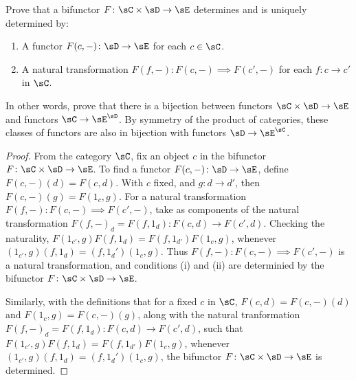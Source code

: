 \documentclass[../../main]{subfiles}
\begin{document}
\begin{exercise}
	Prove that a bifunctor $F\colon \sC \times \sD \rightarrow \sE$ determines and is
	uniquely determined by:
	\begin{enumerate}
		\item A functor $F(c,-)\colon\sD \rightarrow \sE$ for each $c \in \sC$.
		\item A natural transformation $F(f,-)\colon F(c,-) \implies F(c',-)$
			for each $f\colon c \rightarrow c'$ in $\sC$.
	\end{enumerate}
	In other words, prove that there is a bijection between functors $\sC \times
	\sD \rightarrow \sE$ and functors $\sC \rightarrow \sE^\sD $. By symmetry of the product
	of categories, these classes of functors are also in bijection with functors
	\(\sD\to\sE^\sC\).
\end{exercise}

\begin{proof}
	From the category $\sC$, fix an object $c$ in the bifunctor $F\colon \sC \times
	\sD
	\rightarrow \sE$. To find a functor $F(c,-)\colon\sD \rightarrow \sE$, define
	$F(c,-)(d) = F(c,d)$. With $c$ fixed, and $g\colon d \rightarrow d'$, then
	$F(c,-)(g) = F(1_c, g)$. For a natural transformation $F(f,-)\colon F(c,-)
	\implies F(c',-)$, take as components of the natural transformation
	$F(f,-)_d = F(f, 1_d) \colon F(c,d) \rightarrow F(c',d)$. Checking the
	naturality, $F(1_{c'}, g) F(f, 1_d) = F(f, 1_{d'}) F(1_c, g)$, whenever
	$(1_{c'}, g)(f, 1_d) = (f, 1_d')(1_c,g)$. Thus $F(f,-)\colon F(c,-) \implies
	F(c',-)$ is a natural transformation, and conditions (i) and (ii) are
	determinied by the bifunctor $F\colon \sC \times \sD \rightarrow \sE$.

	Similarly, with the definitions that for a fixed $c$ in $\sC$, $F(c,d) =
	F(c,-)(d)$ and $F(1_c, g) = F(c,-)(g)$, along with the natural tranformation
	$F(f,-)_d = F(f, 1_d) \colon F(c,d) \rightarrow F(c',d)$, such that $F(1_{c'}, g)
	F(f, 1_d) = F(f, 1_{d'}) F(1_c, g)$, whenever $(1_{c'}, g)(f, 1_d) = (f,
	1_d')(1_c,g)$, the bifunctor $F\colon \sC \times \sD \rightarrow \sE$ is determined.
\end{proof}
\end{document}

